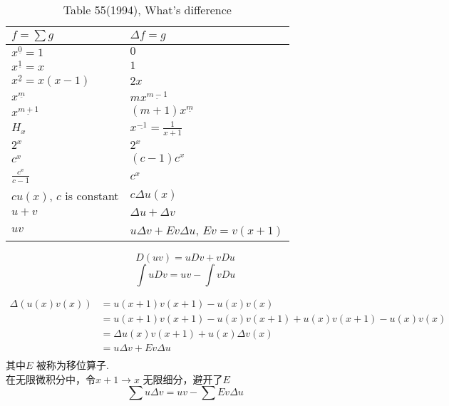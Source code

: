 \documentclass[mode=geye, chinesefont=founder]{elegantnote}
\newcommand{\fallingfactorial}[1]{%
  ^{\underline{#1}}%
}
\begin{document}
\begin{table}[htbp]
	\centering
	\small
	\caption{Table 55(1994), What's difference}
	\begin{tabular}{l|l}
		\toprule
        $ f=\sum g $ & $ \Delta f= g $ \\
		\midrule
        $ x\fallingfactorial{0}=1 $ & $ 0 $ \\
        $ x\fallingfactorial{1}=x $ & $ 1 $ \\
        $ x\fallingfactorial{2}=x(x-1) $ & $ 2x $ \\
        $ x\fallingfactorial{m}   $ & $ m x\fallingfactorial{m-1} $ \\
        $ x\fallingfactorial{m+1} $ & $ (m+1) x\fallingfactorial{m} $ \\
        $ H_x $ & $ x\fallingfactorial{-1}=\frac{1}{x+1} $ \\
        $ 2^x $ & $ 2^x $ \\
        $ c^x $ & $ (c-1) c^x $ \\
        $ \frac{c^x}{c-1} $ & $  c^x $ \\
        $ cu(x) $, $ c $ is constant  & $ c\Delta u(x) $ \\
        $ u+v $ & $ \Delta u+\Delta v $ \\
        $ uv $ & $ u\Delta v+Ev \Delta u $, $ Ev=v(x+1) $  \\
		\bottomrule
	\end{tabular}%
	\label{tab:55rightside}%
\end{table}%
\begin{equation}
    D(uv)=uDv+vDu
\end{equation}
\begin{equation}
    \int uDv = uv - \int vDu
\end{equation}

\begin{equation}
    \begin{array}{rl}
        \Delta (u(x)v(x))
        &=u(x+1)v(x+1)-u(x)v(x)\\
        &=u(x+1)v(x+1)-u(x)v(x+1)+u(x)v(x+1) -u(x)v(x)\\
        &=\Delta u(x)v(x+1)+u(x)\Delta v(x)\\
        &=u\Delta v+Ev \Delta u\\
    \end{array}
\end{equation}
其中$ E $ 被称为移位算子.\\
在无限微积分中，令$ x+1 \rightarrow x $ 无限细分，避开了$ E $ 
\begin{equation}
    \sum u\Delta v = uv - \sum Ev \Delta u
\end{equation} 
\end{document}
